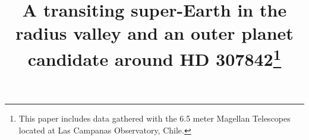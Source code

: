 \documentclass[twocolumn]{aastex631}
\begin{document}
\title{A transiting super-Earth in the radius valley and an outer planet candidate around HD 307842\footnote{This paper includes data gathered with the 6.5 meter Magellan Telescopes located at Las Campanas Observatory, Chile.}}


\end{document}
